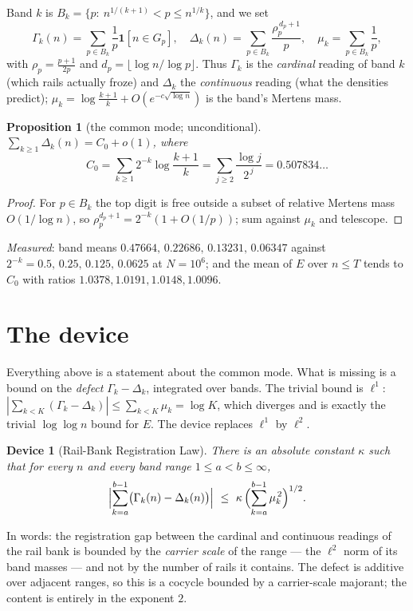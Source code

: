 \documentclass[11pt]{article}
\newtheorem{proposition}[theorem]{Proposition}
\newtheorem{device}[theorem]{Device}
\begin{document}
Band $k$ is $B_k=\{p:\ n^{1/(k+1)}<p\le n^{1/k}\}$, and we set
\[
  \Gamma_k(n)=\sum_{p\in B_k}\frac1p\mathbf 1[n\in G_p],
  \quad
  \Delta_k(n)=\sum_{p\in B_k}\frac{\rho_p^{\,d_p+1}}{p},
  \quad
  \mu_k=\sum_{p\in B_k}\frac1p,
\]
with $\rho_p=\frac{p+1}{2p}$ and $d_p=\lfloor\log n/\log p\rfloor$.  Thus
$\Gamma_k$ is the \emph{cardinal} reading of band $k$ (which rails actually
froze) and $\Delta_k$ the \emph{continuous} reading (what the densities predict);
$\mu_k=\log\frac{k+1}{k}+O(e^{-c\sqrt{\log n}})$ is the band's Mertens mass.

\begin{proposition}[the common mode; unconditional]\label{prop:dc}
$\displaystyle\sum_{k\ge1}\Delta_k(n)=C_0+o(1)$, where
\[
  C_0=\sum_{k\ge1}2^{-k}\log\frac{k+1}{k}=\sum_{j\ge2}\frac{\log j}{2^{\,j}}=0.507834\ldots
\]
\end{proposition}

\begin{proof}
For $p\in B_k$ the top digit is free outside a subset of relative Mertens mass
$O(1/\log n)$, so $\rho_p^{d_p+1}=2^{-k}(1+O(1/p))$; sum against $\mu_k$ and
telescope.
\end{proof}

\emph{Measured}: band means $0.47664,\,0.22686,\,0.13231,\,0.06347$ against
$2^{-k}=0.5,\,0.25,\,0.125,\,0.0625$ at $N=10^6$; and the mean of $E$ over
$n\le T$ tends to $C_0$ with ratios $1.0378,1.0191,1.0148,1.0096$.

\section{The device}

Everything above is a statement about the common mode.  What is missing is a
bound on the \emph{defect} $\Gamma_k-\Delta_k$, integrated over bands.  The
trivial bound is $\ell^1$: $|\sum_{k<K}(\Gamma_k-\Delta_k)|\le\sum_{k<K}\mu_k
=\log K$, which diverges and is exactly the trivial $\log\log n$ bound for $E$.
The device replaces $\ell^1$ by $\ell^2$.

\begin{device}[Rail-Bank Registration Law]\label{dev:rbrl}
There is an absolute constant $\kappa$ such that for every $n$ and every band
range $1\le a<b\le\infty$,
\[
  \Bigl|\sum_{k=a}^{b-1}\bigl(\Gamma_k(n)-\Delta_k(n)\bigr)\Bigr|
  \ \le\ \kappa\,\Bigl(\sum_{k=a}^{b-1}\mu_k^{\,2}\Bigr)^{1/2}.
\]
\end{device}

In words: the registration gap between the cardinal and continuous readings of
the rail bank is bounded by the \emph{carrier scale} of the range --- the
$\ell^2$ norm of its band masses --- and not by the number of rails it contains.
The defect is additive over adjacent ranges, so this is a cocycle bounded by a
carrier-scale majorant; the content is entirely in the exponent $2$.
\end{document}

